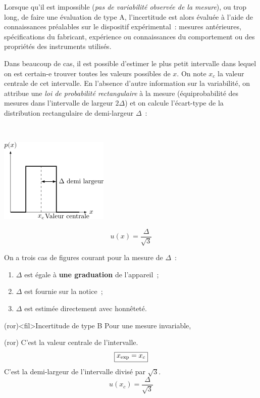 \documentclass[../main/main.tex]{subfiles}
\begin{document}
Lorsque qu'il est impossible (\textit{pas de variabilité observée de la
mesure}), ou trop long, de faire une évaluation de type A, l'incertitude est
alors évaluée à l'aide de connaissances préalables sur le dispositif
expérimental~: mesures antérieures, spécifications du fabricant, expérience ou
connaissances du comportement ou des propriétés des instruments utilisés.
\bigbreak
\noindent
\begin{minipage}[t]{.50\linewidth}
  Dans beaucoup de cas, il est possible d'estimer le plus petit intervalle dans
  lequel on est certain-e trouver toutes les valeurs possibles de $x$. On note
  $x_c$ la valeur centrale de cet intervalle.
  \smallbreak
  En l'absence d'autre information sur la variabilité, on attribue une
  \textit{loi de probabilité rectangulaire} à la mesure (équiprobabilité des
  mesures dans l'intervalle de largeur $2\Delta$) et on calcule l'écart-type de
  la distribution rectangulaire de demi-largeur $\Delta$~:
\end{minipage}
\hfill
\begin{minipage}[t]{.45\linewidth}
  ~
  \vspace*{-10pt}
  \begin{center}
    \includegraphics[scale=1]{typeB}
    \label{fig:typeB}
  \end{center}
\end{minipage}
\[
  \boxed{u(x) = \frac{\Delta}{\sqrt{3}}}
\]

On a trois cas de figures courant pour la mesure de $\Delta$~:
\begin{enumerate}
  \item $\Delta$ est égale à \textbf{une graduation} de l'appareil~;
  \item $\Delta$ est fournie sur la notice~;
  \item $\Delta$ est estimée directement avec honnêteté.
\end{enumerate}

\begin{tcb}(ror)<fil>{Incertitude de type B}
  Pour une mesure invariable,
  \smallbreak
  \begin{isd}[cnt](ror)
    C'est la valeur centrale de l'intervalle.
    \[
      \boxed{x_{\rm exp} = x_c}
    \]
    \tcblower
    C'est la demi-largeur de l'intervalle divisé par $\sqrt{3}$.
    \[
      \boxed{u(x_c) = \frac{\Delta}{\sqrt{3}}}
    \]
  \end{isd}
\end{tcb}
\end{document}
